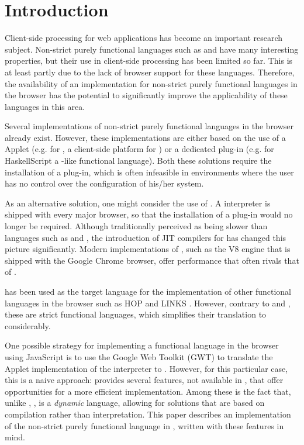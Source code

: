 \section{Introduction}\label{sapljs:sec:intro}
Client-side processing for web applications has become an important research
subject. Non-strict purely functional languages such as \Haskell and \Clean have
many interesting properties, but their use in client-side processing has been
limited so far. This is at least partly due to the lack of browser support for
these languages. Therefore, the availability of  an implementation for
non-strict purely functional languages in the browser has the potential to
significantly improve the applicability of these languages in this area.

Several implementations of non-strict purely functional languages in the browser
already exist. However, these implementations are either based on the use of a
\Java Applet (e.g. for \Sapl, a client-side platform for \Clean
\cite{JKP,PJKA}) or a dedicated plug-in (e.g. for \textsf{HaskellScript} 
\cite{HaskellScript} a \Haskell-like functional language). Both these solutions
require the installation of a plug-in, which is often infeasible in environments
where the user has no control over the configuration of his/her system.

As an alternative solution, one might consider the use of \JavaScript. A
\JavaScript interpreter is shipped with every major browser, so that the
installation of a plug-in would no longer be required.  Although traditionally
perceived as being slower than languages such as \Java and \C, the introduction 
of JIT compilers for \JavaScript has changed this picture significantly. Modern
implementations of \JavaScript, such as the V8 engine that is shipped with the
Google Chrome browser, offer performance that often rivals that of \Java.

\JavaScript has been used as the target language for the implementation of
other functional languages in the browser such as HOP and LINKS
\cite{HOP1,HOP2,LINKS1}. However, contrary to \Haskell and \Clean, these are
strict functional languages, which simplifies their translation to \JavaScript
considerably.

One possible strategy for implementing a functional language in the browser
using JavaScript is to use the Google Web Toolkit (GWT) to translate the \Java 
Applet implementation of the \Sapl interpreter to \JavaScript. However, for this
particular case, this is a naive approach: \JavaScript provides several
features, not available in \Java, that offer opportunities for a more efficient 
implementation. Among these is the fact that, unlike \Java, \JavaScript, is a 
{\em dynamic} language, allowing for solutions that are based on compilation 
rather than interpretation. This paper describes an implementation of the
non-strict purely functional language \Sapl in \JavaScript, written with these 
features in mind.

